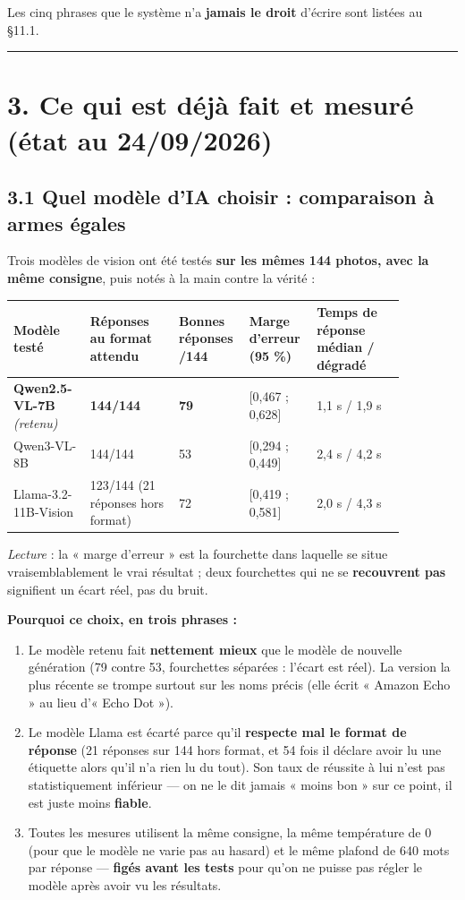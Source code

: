 \documentclass[11pt,a4paper]{article}
\begin{document}
Les cinq phrases que le système n'a \textbf{jamais le droit} d'écrire sont listées au §11.1.

\medskip\hrule\medskip
\section*{3. Ce qui est déjà fait et mesuré (état au 24/09/2026)}
\subsection*{3.1 Quel modèle d'IA choisir : comparaison à armes égales}
Trois modèles de vision ont été testés \textbf{sur les mêmes 144 photos, avec la même consigne}, puis notés à la main contre la vérité :

\sloppy
\begin{longtable}{|p{0.180\linewidth}|p{0.212\linewidth}|p{0.129\linewidth}|p{0.135\linewidth}|p{0.212\linewidth}|}
\hline
\textbf{Modèle testé} & \textbf{Réponses au format attendu} & \textbf{Bonnes réponses /144} & \textbf{Marge d'erreur (95 \%)} & \textbf{Temps de réponse médian / dégradé} \\ \hline
\endhead
\textbf{Qwen2.5-VL-7B} \textit{(retenu)} & \textbf{144/144} & \textbf{79} & [0,467 ; 0,628] & 1,1 s / 1,9 s \\ \hline
Qwen3-VL-8B & 144/144 & 53 & [0,294 ; 0,449] & 2,4 s / 4,2 s \\ \hline
Llama-3.2-11B-Vision & 123/144 (21 réponses hors format) & 72 & [0,419 ; 0,581] & 2,0 s / 4,3 s \\ \hline
\end{longtable}
\textit{Lecture} : la « marge d'erreur » est la fourchette dans laquelle se situe vraisemblablement le vrai résultat ; deux fourchettes qui ne se \textbf{recouvrent pas} signifient un écart réel, pas du bruit.

\textbf{Pourquoi ce choix, en trois phrases :}

\begin{enumerate}  \item Le modèle retenu fait \textbf{nettement mieux} que le modèle de nouvelle génération (79 contre 53, fourchettes séparées : l'écart est réel). La version la plus récente se trompe surtout sur les noms précis (elle écrit « Amazon Echo » au lieu d'« Echo Dot »).
  \item Le modèle Llama est écarté parce qu'il \textbf{respecte mal le format de réponse} (21 réponses sur 144 hors format, et 54 fois il déclare avoir lu une étiquette alors qu'il n'a rien lu du tout). Son taux de réussite à lui n'est pas statistiquement inférieur — on ne le dit jamais « moins bon » sur ce point, il est juste moins \textbf{fiable}.
  \item Toutes les mesures utilisent la même consigne, la même température de 0 (pour que le modèle ne varie pas au hasard) et le même plafond de 640 mots par réponse — \textbf{figés avant les tests} pour qu'on ne puisse pas régler le modèle après avoir vu les résultats.
\end{enumerate}
\end{document}
